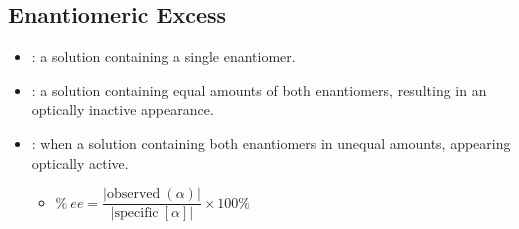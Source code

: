 \documentclass{inVerba-notes}
\begin{document}
\begin{itemize}
    \subsection{Enantiomeric Excess}
    \begin{itemize}
        \item {}: a solution containing a single enantiomer.
        \item {}: a solution containing equal amounts of both enantiomers, resulting in an optically inactive appearance.
        \item {}: when a solution containing both enantiomers in unequal amounts, appearing optically active.
            \begin{itemize}
                \item \( \%~ee = \dfrac{|\text{observed}~(\alpha)|}{|\text{specific}~[\alpha]|} \times 100\% \)
            \end{itemize}
    \end{itemize}
\end{itemize}
\end{document}
